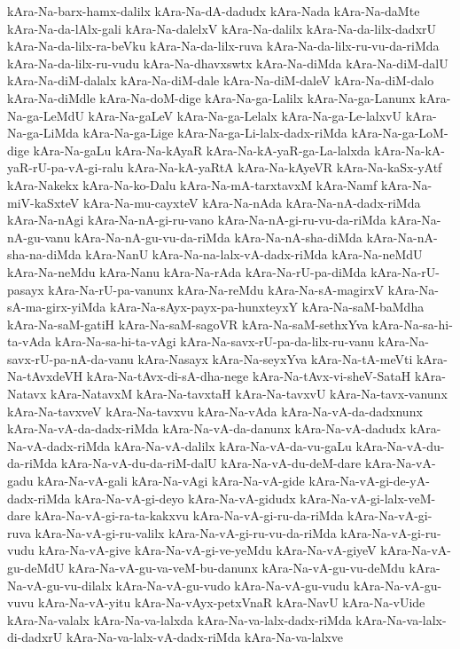 {kAra-Na-barx-hamx-dalilx
kAra-Na-dA-dadudx
kAra-Nada
kAra-Na-daMte
kAra-Na-da-lAlx-gali
kAra-Na-dalelxV
kAra-Na-dalilx
kAra-Na-da-lilx-dadxrU
kAra-Na-da-lilx-ra-beVku
kAra-Na-da-lilx-ruva
kAra-Na-da-lilx-ru-vu-da-riMda
kAra-Na-da-lilx-ru-vudu
kAra-Na-dhavxswtx
kAra-Na-diMda
kAra-Na-diM-dalU
kAra-Na-diM-dalalx
kAra-Na-diM-dale
kAra-Na-diM-daleV
kAra-Na-diM-dalo
kAra-Na-diMdle
kAra-Na-doM-dige
kAra-Na-ga-Lalilx
kAra-Na-ga-Lanunx
kAra-Na-ga-LeMdU
kAra-Na-gaLeV
kAra-Na-ga-Lelalx
kAra-Na-ga-Le-lalxvU
kAra-Na-ga-LiMda
kAra-Na-ga-Lige
kAra-Na-ga-Li-lalx-dadx-riMda
kAra-Na-ga-LoM-dige
kAra-Na-gaLu
kAra-Na-kAyaR
kAra-Na-kA-yaR-ga-La-lalxda
kAra-Na-kA-yaR-rU-pa-vA-gi-ralu
kAra-Na-kA-yaRtA
kAra-Na-kAyeVR
kAra-Na-kaSx-yAtf
kAra-Nakekx
kAra-Na-ko-Dalu
kAra-Na-mA-tarxtavxM
kAra-Namf
kAra-Na-miV-kaSxteV
kAra-Na-mu-cayxteV
kAra-Na-nAda
kAra-Na-nA-dadx-riMda
kAra-Na-nAgi
kAra-Na-nA-gi-ru-vano
kAra-Na-nA-gi-ru-vu-da-riMda
kAra-Na-nA-gu-vanu
kAra-Na-nA-gu-vu-da-riMda
kAra-Na-nA-sha-diMda
kAra-Na-nA-sha-na-diMda
kAra-NanU
kAra-Na-na-lalx-vA-dadx-riMda
kAra-Na-neMdU
kAra-Na-neMdu
kAra-Nanu
kAra-Na-rAda
kAra-Na-rU-pa-diMda
kAra-Na-rU-pasayx
kAra-Na-rU-pa-vanunx
kAra-Na-reMdu
kAra-Na-sA-magirxV
kAra-Na-sA-ma-girx-yiMda
kAra-Na-sAyx-payx-pa-hunxteyxY
kAra-Na-saM-baMdha
kAra-Na-saM-gatiH
kAra-Na-saM-sagoVR
kAra-Na-saM-sethxYva
kAra-Na-sa-hi-ta-vAda
kAra-Na-sa-hi-ta-vAgi
kAra-Na-savx-rU-pa-da-lilx-ru-vanu
kAra-Na-savx-rU-pa-nA-da-vanu
kAra-Nasayx
kAra-Na-seyxYva
kAra-Na-tA-meVti
kAra-Na-tAvxdeVH
kAra-Na-tAvx-di-sA-dha-nege
kAra-Na-tAvx-vi-sheV-SataH
kAra-Natavx
kAra-NatavxM
kAra-Na-tavxtaH
kAra-Na-tavxvU
kAra-Na-tavx-vanunx
kAra-Na-tavxveV
kAra-Na-tavxvu
kAra-Na-vAda
kAra-Na-vA-da-dadxnunx
kAra-Na-vA-da-dadx-riMda
kAra-Na-vA-da-danunx
kAra-Na-vA-dadudx
kAra-Na-vA-dadx-riMda
kAra-Na-vA-dalilx
kAra-Na-vA-da-vu-gaLu
kAra-Na-vA-du-da-riMda
kAra-Na-vA-du-da-riM-dalU
kAra-Na-vA-du-deM-dare
kAra-Na-vA-gadu
kAra-Na-vA-gali
kAra-Na-vAgi
kAra-Na-vA-gide
kAra-Na-vA-gi-de-yA-dadx-riMda
kAra-Na-vA-gi-deyo
kAra-Na-vA-gidudx
kAra-Na-vA-gi-lalx-veM-dare
kAra-Na-vA-gi-ra-ta-kakxvu
kAra-Na-vA-gi-ru-da-riMda
kAra-Na-vA-gi-ruva
kAra-Na-vA-gi-ru-valilx
kAra-Na-vA-gi-ru-vu-da-riMda
kAra-Na-vA-gi-ru-vudu
kAra-Na-vA-give
kAra-Na-vA-gi-ve-yeMdu
kAra-Na-vA-giyeV
kAra-Na-vA-gu-deMdU
kAra-Na-vA-gu-va-veM-bu-danunx
kAra-Na-vA-gu-vu-deMdu
kAra-Na-vA-gu-vu-dilalx
kAra-Na-vA-gu-vudo
kAra-Na-vA-gu-vudu
kAra-Na-vA-gu-vuvu
kAra-Na-vA-yitu
kAra-Na-vAyx-petxVnaR
kAra-NavU
kAra-Na-vUide
kAra-Na-valalx
kAra-Na-va-lalxda
kAra-Na-va-lalx-dadx-riMda
kAra-Na-va-lalx-di-dadxrU
kAra-Na-va-lalx-vA-dadx-riMda
kAra-Na-va-lalxve
}
